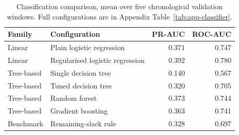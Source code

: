 \begin{table}[ht]
\centering\small
\caption{Classification comparison, mean over five chronological validation windows. Full configurations are in Appendix Table~\ref{tab:app-classifier}.}
\label{tab:family-summary}
\begin{tabular}{@{}llrr@{}}
\toprule
Family & Configuration & PR-AUC & ROC-AUC \\
\midrule
Linear & Plain logistic regression & 0.371 & 0.747 \\
Linear & Regularised logistic regression & 0.392 & 0.780 \\
Tree-based & Single decision tree & 0.140 & 0.567 \\
Tree-based & Tuned decision tree & 0.320 & 0.705 \\
Tree-based & Random forest & 0.373 & 0.744 \\
Tree-based & Gradient boosting & 0.363 & 0.741 \\
Benchmark & Remaining-slack rule & 0.328 & 0.697 \\
\bottomrule
\end{tabular}
\end{table}
